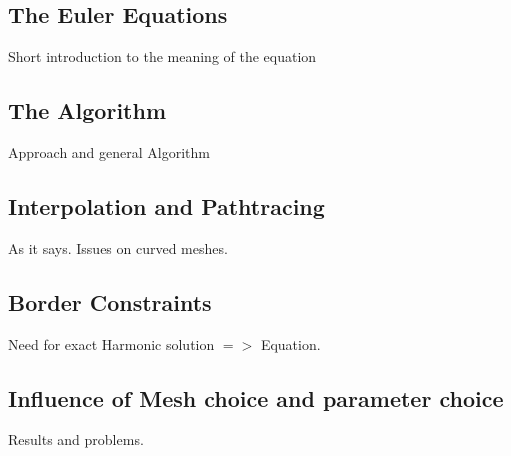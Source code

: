 \documentclass{scrartcl}
\begin{document}
	\subsection{The Euler Equations}
	Short introduction to the meaning of the equation
	\subsection{The Algorithm}
	Approach and general Algorithm
	\subsection{Interpolation and Pathtracing}
	As it says. Issues on curved meshes.
	\subsection{Border Constraints}
	Need for exact Harmonic solution $=>$ Equation.
	\subsection{Influence of Mesh choice and parameter choice}
	Results and problems.
\end{document}
